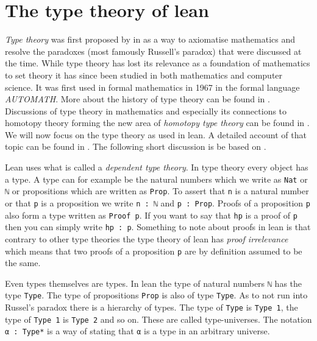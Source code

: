 \section{The type theory of lean}

\emph{Type theory} was first proposed by  in \citeyear{Russell1908} \cite{Russell1908} as a way to axiomatise mathematics and resolve the paradoxes (most famously Russell's paradox) that were discussed at the time. 
While type theory has lost its relevance as a foundation of mathematics to set theory it has since been studied in both mathematics and computer science. 
It was first used in formal mathematics in 1967 in the formal language \emph{AUTOMATH}. 
More about the history of type theory can be found in \cite{Kamareddine2004}. Discussions of type theory in mathematics and especially its connections to homotopy theory forming the new area of \emph{homotopy type theory} can be found in \cite{hottbook}.
We will now focus on the type theory as used in lean.
A detailed account of that topic can be found in \cite{Carneiro2019}. 
The following short discussion is be based on \cite{Avigad2024}. 

Lean uses what is called a \emph{dependent type theory}.
In type theory every object has a type. 
A type can for example be the natural numbers which we write as \lstinline{Nat} or \lstinline{ℕ} or propositions which are written as \lstinline{Prop}.
To assert that \lstinline{n} is a natural number or that \lstinline{p} is a proposition we write \lstinline{n : ℕ} and \lstinline{p : Prop}. 
Proofs of a proposition \lstinline{p} also form a type written as \lstinline{Proof p}.
If you want to say that \lstinline{hp} is a proof of \lstinline{p} then you can simply write \lstinline{hp : p}.
Something to note about proofs in lean is that contrary to other type theories the type theory of lean has \emph{proof irrelevance} which means that two proofs of a proposition \lstinline{p} are by definition assumed to be the same.

Even types themselves are types. 
In lean the type of natural numbers \lstinline{ℕ} has the type \lstinline{Type}. 
The type of propositions \lstinline{Prop} is also of type \lstinline{Type}.
As to not run into Russel's paradox there is a hierarchy of types. 
The type of \lstinline{Type} is \lstinline{Type 1}, the type of \lstinline{Type 1} is \lstinline{Type 2} and so on.
These are called type-universes. 
The notation \lstinline{α : Type*} is a way of stating that \lstinline{α} is a type in an arbitrary universe.

